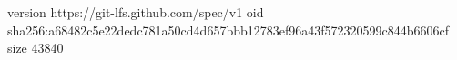 version https://git-lfs.github.com/spec/v1
oid sha256:a68482c5e22dedc781a50cd4d657bbb12783ef96a43f572320599c844b6606cf
size 43840
